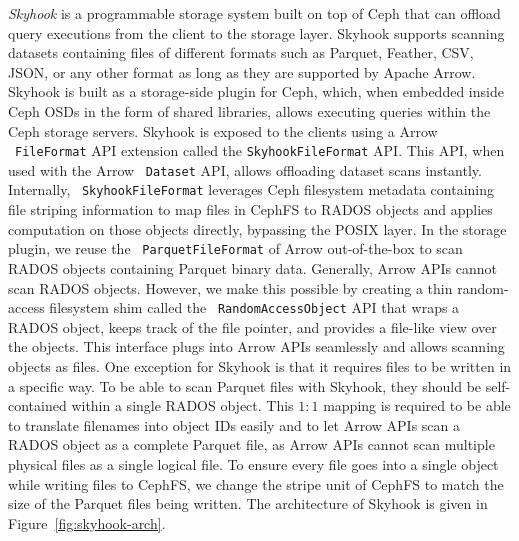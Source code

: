 \documentclass[12pt]{article}
\newcommand{\code}[1]{\colorbox{light-gray}{\texttt{#1}}}
\begin{document}
\textit{Skyhook} is a programmable storage system built on top of Ceph that can offload query executions from the client to the storage layer. Skyhook supports scanning datasets containing files of different formats such as Parquet, Feather, CSV, JSON, or any other format as long as they are supported by Apache Arrow. Skyhook is built as a storage-side plugin for Ceph, which, when embedded inside Ceph OSDs in the form of shared libraries, allows executing queries within the Ceph storage servers. Skyhook is exposed to the clients using a Arrow ~\code{FileFormat} API extension called the \code{SkyhookFileFormat} API. This API, when used with the Arrow ~\code{Dataset} API, allows offloading dataset scans instantly. Internally, ~\code{SkyhookFileFormat} leverages Ceph filesystem metadata containing file striping information to map files in CephFS to RADOS objects and applies computation on those objects directly, bypassing the POSIX layer. In the storage plugin, we reuse the ~\code{ParquetFileFormat} of Arrow out-of-the-box to scan RADOS objects containing Parquet binary data. Generally, Arrow APIs cannot scan RADOS objects. However, we make this possible by creating a thin random-access filesystem shim called the ~\code{RandomAccessObject} API that wraps a RADOS object, keeps track of the file pointer, and provides a file-like view over the objects. This interface plugs into Arrow APIs seamlessly and allows scanning objects as files. One exception for Skyhook is that it requires files to be written in a specific way. To be able to scan Parquet files with Skyhook, they should be self-contained within a single RADOS object. This $1:1$ mapping is required to be able to translate filenames into object IDs easily and to let Arrow APIs scan a RADOS object as a complete Parquet file, as Arrow APIs cannot scan multiple physical files as a single logical file. To ensure every file goes into a single object while writing files to CephFS, we change the stripe unit of CephFS to match the size of the Parquet files being written. The architecture of Skyhook is given in Figure~\ref{fig:skyhook-arch}.
\end{document}
